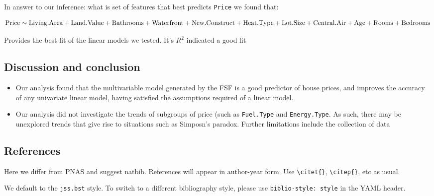 \documentclass[letterpaper,9pt,twocolumn,twoside,]{pinp}
\providecommand{\tightlist}{%
  \setlength{\itemsep}{0pt}\setlength{\parskip}{0pt}}
\begin{document}
In answer to our inference: what is set of features that best predicts
\texttt{Price} we found that:

\[\text{Price} \sim \text{Living.Area} + \text{Land.Value} + \text{Bathrooms} +\\ \text{Waterfront} +     \text{New.Construct} + \text{Heat.Type} + \text{Lot.Size} + \\\text{Central.Air} + \text{Age} + \text{Rooms} + \text{Bedrooms}\]

Provides the best fit of the linear models we tested. It's \(R^2\)
indicated a good fit

\hypertarget{discussion-and-conclusion}{%
\subsection{Discussion and conclusion}\label{discussion-and-conclusion}}

\begin{itemize}
\tightlist
\item
  Our analysis found that the multivariable model generated by the FSF
  is a good predictor of house prices, and improves the accuracy of any
  univariate linear model, having satisfied the assumptions required of
  a linear model.
\item
  Our analysis did not investigate the trends of subgroups of price
  (such as \texttt{Fuel.Type} and \texttt{Energy.Type}. As such, there
  may be unexplored trends that give rise to situations such as
  Simposn's paradox. Further limitations include the collection of data
\end{itemize}

\hypertarget{references}{%
\subsection{References}\label{references}}

Here we differ from PNAS and suggest natbib. References will appear in
author-year form. Use \texttt{\textbackslash{}citet\{\}},
\texttt{\textbackslash{}citep\{\}}, etc as usual.

We default to the \texttt{jss.bst} style. To switch to a different
bibliography style, please use \texttt{biblio-style:\ style} in the YAML
header.

\showacknow




\end{document}
